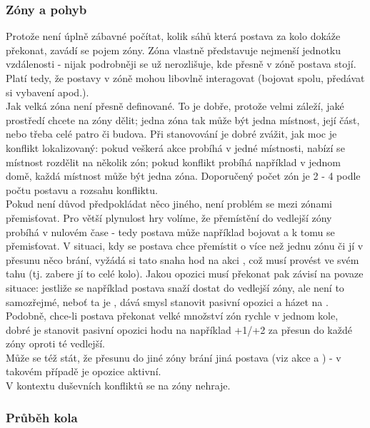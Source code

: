 \documentclass[../main.tex]{subfiles}
\begin{document}
\subsubsection{Zóny a pohyb}
\label{sec:zónyapohyb}

Protože není úplně zábavné počítat, kolik sáhů  která postava za kolo dokáže překonat, zavádí se pojem zóny. Zóna vlastně představuje nejmenší jednotku vzdálenosti - nijak podrobněji se už nerozlišuje, kde přesně v zóně postava stojí. Platí tedy, že postavy v zóně mohou libovlně interagovat (bojovat spolu, předávat si vybavení apod.).\\
Jak velká zóna není přesně definované. To je dobře, protože velmi záleží, jaké prostředí chcete na zóny dělit; jedna zóna tak může být jedna místnost, její část, nebo třeba celé patro či budova. Při stanovování je dobré zvážit, jak moc je konflikt lokalizovaný: pokud veškerá akce probíhá v jedné místnosti, nabízí se místnost rozdělit na několik zón; pokud konflikt probíhá například v jednom domě, každá místnost může být jedna zóna. Doporučený počet zón je 2 - 4 podle počtu postavu a rozsahu konfliktu.\\
Pokud není důvod předpokládat něco jiného, není problém se mezi zónami přemisťovat. Pro větší plynulost hry volíme, že přemístění do vedlejší zóny probíhá v nulovém čase - tedy postava může například bojovat a k tomu se přemisťovat. V situaci, kdy se postava chce přemístit o více než jednu zónu či jí v přesunu něco brání, vyžádá si tato snaha hod na akci , což musí provést ve svém tahu (tj. zabere jí to celé kolo). Jakou opozici musí překonat pak závisí na povaze situace: jestliže se například postava snaží dostat do vedlejší zóny, ale není to samozřejmé, neboť ta je , dává smysl stanovit pasivní opozici a házet na . Podobně, chce-li postava překonat velké množství zón rychle v jednom kole, dobré je stanovit pasivní opozici hodu na například +1/+2 za přesun do každé zóny oproti té vedlejší.\\
Může se též stát, že přesunu do jiné zóny brání jiná postava (viz akce  a ) - v takovém případě je opozice aktivní.\\
V kontextu duševních konfliktů se na zóny nehraje.


\subsubsection{Průběh kola}
\label{sec:prubehkola}
\end{document}
